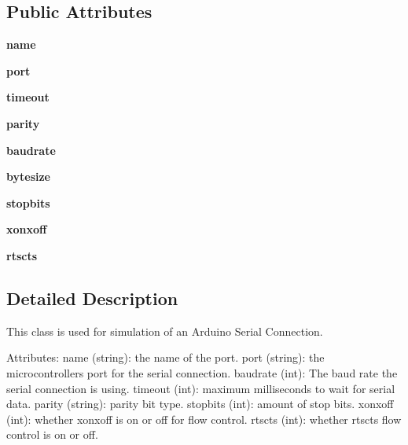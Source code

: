 \subsection*{Public Attributes}
\begin{DoxyCompactItemize}
\item 
\mbox{\label{classfake_serial_1_1_serial_af3d8449c9f1992bbe479981375083651}} 
{\bfseries name}
\item 
\mbox{\label{classfake_serial_1_1_serial_a53d2e25f2f6b6654ba6740cb57242758}} 
{\bfseries port}
\item 
\mbox{\label{classfake_serial_1_1_serial_aac1940cde2e2c8018d9be60b53bd6644}} 
{\bfseries timeout}
\item 
\mbox{\label{classfake_serial_1_1_serial_a0b5e1c24e2dd47ba832bd4a26b5c0027}} 
{\bfseries parity}
\item 
\mbox{\label{classfake_serial_1_1_serial_afe5ee18e12722951265fdd9d4fa81a51}} 
{\bfseries baudrate}
\item 
\mbox{\label{classfake_serial_1_1_serial_afc2c7273bcb952833c250bda88ba2d08}} 
{\bfseries bytesize}
\item 
\mbox{\label{classfake_serial_1_1_serial_ac0e590a34ac343c929e4a8543e933cce}} 
{\bfseries stopbits}
\item 
\mbox{\label{classfake_serial_1_1_serial_a66d563b6efbcddbe5b6b295f5446a268}} 
{\bfseries xonxoff}
\item 
\mbox{\label{classfake_serial_1_1_serial_aadb7fe53208ef570c79b1b66d8eb2ad7}} 
{\bfseries rtscts}
\end{DoxyCompactItemize}


\subsection{Detailed Description}
\begin{DoxyVerb}This class is used for simulation of an Arduino Serial Connection.

Attributes:
    name (string): the name of the port.
    port (string): the microcontrollers port for the serial connection.
    baudrate (int): The baud rate the serial connection is using.
    timeout (int): maximum milliseconds to wait for serial data.
    parity (string): parity bit type.
    stopbits (int): amount of stop bits.
    xonxoff (int): whether xonxoff is on or off for flow control.
    rtscts (int): whether rtscts flow control is on or off.
\end{DoxyVerb}
 

